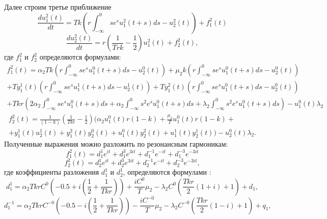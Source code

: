 \documentclass[12pt]{article}
\begin{document}
Далее строим третье приближение
\begin{equation}\label{s3}
       \frac{d u^2_1(t)}{d t}=T k \left(r \int_{-\infty}^{0} s e^{s}u^2_1(t+s)d s -  u^2_2 (t) \right) + f^2_1 (t)
   \end{equation}
   \begin{equation*}
   \frac{d u^2_2(t)}{d t}= r\left(\frac{1}{T r k} -\frac{1}{2}\right)u^2_1(t)+f^2_2 (t) ,
\end{equation*}
где $ f^2_1 $ и $f^2_2$ определяются формулами:
\begin{multline}
    f^2_1 (t)=\alpha_2 T k \left( r \int_{-\infty}^{0} s e^{s} u^0_1 (t+s) d s - u^0_2 (t) \right)+\mu_2 k \left( r \int_{-\infty}^{0} s e^{s} u^0_1 (t+s) d s - u^0_2 (t) \right)\\ +T y^1_1 (t) \left( r \int_{-\infty}^{0} s e^{s} u^1_1 (t+s) d s - u^1_2 (t) \right)+T y^2_1(t)\left( r \int_{-\infty}^{0} s e^{s} u^0_1 (t+s) d s - u^0_2 (t) \right)  \\+T k r \left(  2  \alpha_2 \int_{-\infty}^{0} s e^{s} u^0_1 (t+s)d s +  \alpha_2 \int_{-\infty}^{0}s^2 e^{s} u^0_1(t+s) d s  
    +\lambda_2 \int_{-\infty}^{0}s^2 e^{s} u^0_1(t+s) d s  \right) - u^0_1 (t) \lambda_2
    \end{multline}
    \begin{multline*}
    f^2_2(t)=\frac{1}{ (1-k)}\left( \frac{1}{T k r} - \frac{1}{2} \right)( \alpha_2  u^0_1(t)r(1-k)+\frac{\mu_2}{T}u^0_1 (t)r(1-k) +\\+ y^1_1(t) u^1_2(t) + y^2_1(t) y^0_2 (t)+ u^0_1(t)y^2_2 (t) + u^1_1 (t)y^1_2 (t)   ) - u^0_2(t) \lambda_2.
    \end{multline*}
Полученные выражения можно разложить по резонансным гармоникам:
 \begin{equation}
      f^2_1(t)=d^1_1 e^{i t}+d^3_1 e^{3 i t} +d^{-1}_1e^{-i t}+d^{-3}_1 e^{-3 i t}
    \end{equation}
    \begin{equation*}
      f^2_2(t)=d^1_2 e^{i t}+d^3_2 e^{3 i t} +d^{-1}_2e^{-i t}+d^{-3}_2 e^{-3 i t},
    \end{equation*}
где коэффициенты разложения $ d^1_1 $ и $ d^1_2 $, определяются формулами :
\begin{equation*}
    d^1_1=\alpha_2 T k r C^0 \left ( -0.5+i(\frac{1}{2}+\frac{1}{T k r}) \right)+\frac{i C^0}{T} \mu_2 - \lambda_2 C^0 (\frac{T k r}{2} (1+i) +1)+d_1,
\end{equation*}
\begin{equation*}
    d^{-1}_1=\alpha_2 T k r C^{-0} \left ( -0.5-i(\frac{1}{2}+\frac{1}{T k r}) \right)-\frac{i C^{-0}}{T} \mu_2 - \lambda_2 C^{-0} (\frac{T k r}{2} (1-i) +1)+q_1,
\end{equation*}
\end{document}
